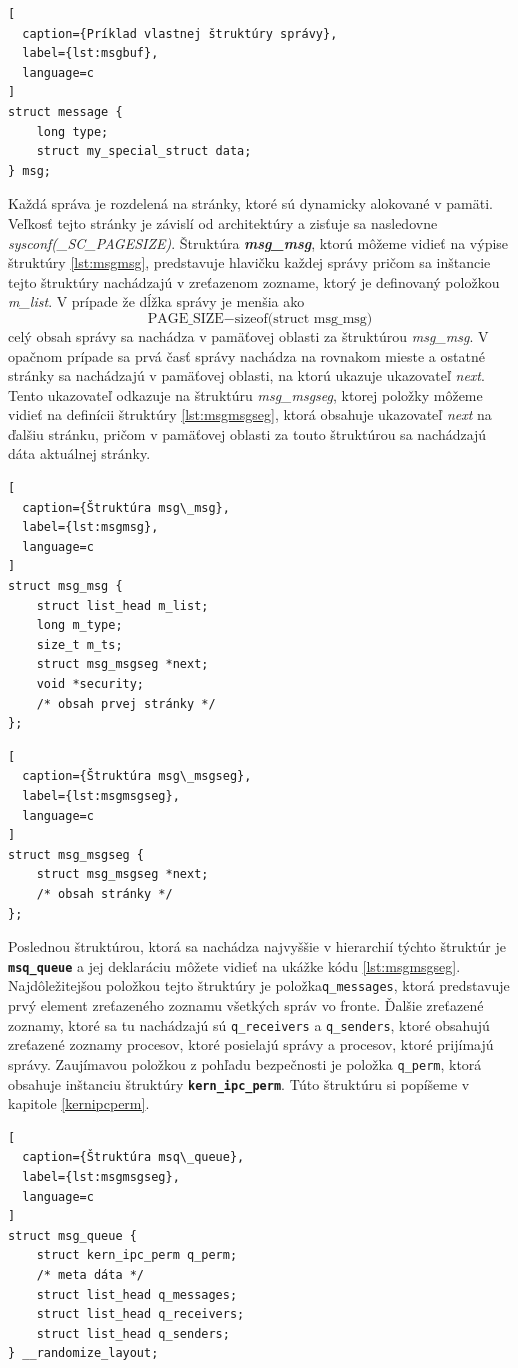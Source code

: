 \begin{lstlisting}[
  caption={Príklad vlastnej štruktúry správy},
  label={lst:msgbuf},
  language=c
]
struct message {
    long type;
    struct my_special_struct data;    
} msg;
\end{lstlisting}

Každá správa je rozdelená na stránky, ktoré sú dynamicky alokované v pamäti. Veľkosť tejto stránky je závislí od architektúry a zisťuje sa nasledovne \textit{sysconf(\_SC\_PAGESIZE)}. Štruktúra \textbf{\textit{msg\_msg}}, ktorú môžeme vidieť na výpise štruktúry \ref{lst:msgmsg}, predstavuje hlavičku každej správy pričom sa inštancie tejto štruktúry nachádzajú v zreťazenom zozname, ktorý je definovaný položkou \textit{m\_list}. V prípade že dĺžka správy je menšia ako $$ \text{PAGE\_SIZE} - \text{sizeof(struct msg\_msg)} $$ celý obsah správy sa nachádza v pamäťovej oblasti za štruktúrou \textit{msg\_msg}. V opačnom prípade sa prvá časť správy nachádza na rovnakom mieste a ostatné stránky sa nachádzajú v pamäťovej oblasti, na ktorú ukazuje ukazovateľ \textit{next}. Tento ukazovateľ odkazuje na štruktúru \textit{msg\_msgseg}, ktorej položky môžeme vidieť na definícii štruktúry \ref{lst:msgmsgseg}, ktorá obsahuje ukazovateľ \textit{next} na ďalšiu stránku, pričom v pamäťovej oblasti za touto štruktúrou sa nachádzajú dáta aktuálnej stránky.
\begin{lstlisting}[
  caption={Štruktúra msg\_msg},
  label={lst:msgmsg},
  language=c
]
struct msg_msg {
	struct list_head m_list;
	long m_type;
	size_t m_ts;
	struct msg_msgseg *next;
	void *security;
	/* obsah prvej stránky */
};
\end{lstlisting}

\begin{lstlisting}[
  caption={Štruktúra msg\_msgseg},
  label={lst:msgmsgseg},
  language=c
]
struct msg_msgseg {
	struct msg_msgseg *next;
	/* obsah stránky */
};
\end{lstlisting}

Poslednou štruktúrou, ktorá sa nachádza najvyššie v hierarchií týchto štruktúr je \texttt{\textbf{msq\_queue}} a jej deklaráciu môžete vidieť na ukážke kódu \ref{lst:msgmsgseg}. Najdôležitejšou položkou tejto štruktúry je položka\texttt{q\_messages}, ktorá predstavuje prvý element zreťazeného zoznamu všetkých správ vo fronte. Ďalšie zreťazené zoznamy, ktoré sa tu nachádzajú sú \texttt{q\_receivers} a \texttt{q\_senders}, ktoré obsahujú zreťazené zoznamy procesov, ktoré posielajú správy a procesov, ktoré prijímajú správy. Zaujímavou položkou z pohľadu bezpečnosti je položka \texttt{q\_perm}, ktorá obsahuje inštanciu štruktúry \texttt{\textbf{kern\_ipc\_perm}}. Túto štruktúru si popíšeme v kapitole \ref{kernipcperm}.\cite{linux}
\begin{lstlisting}[
  caption={Štruktúra msq\_queue},
  label={lst:msgmsgseg},
  language=c
]
struct msg_queue {
	struct kern_ipc_perm q_perm;
	/* meta dáta */		
	struct list_head q_messages;
	struct list_head q_receivers;
	struct list_head q_senders;
} __randomize_layout;
\end{lstlisting}
